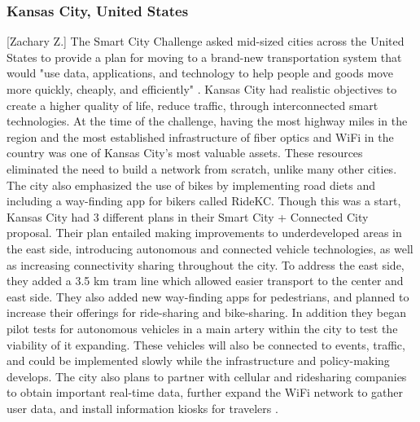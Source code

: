 \documentclass[12pt]{article}                       %
\begin{document}
\subsubsection{Kansas City, United States}[Zachary Z.]
The Smart City Challenge asked mid-sized cities across the United States to provide a plan for moving to a brand-new transportation system that would "use data, applications, and technology to help people and goods move more quickly, cheaply, and efficiently" \cite{2016BeyondChallengeb}. Kansas City had realistic objectives to create a higher quality of life, reduce traffic, through interconnected smart technologies. At the time of the challenge, having the most highway miles in the region and the most established infrastructure of fiber optics and WiFi in the country was one of Kansas City's most valuable assets. These resources eliminated the need to build a network from scratch, unlike many other cities. The city also emphasized the use of bikes by implementing road diets and including a way-finding app for bikers called RideKC. Though this was a start, Kansas City had 3 different plans in their Smart City + Connected City proposal. Their plan entailed making improvements to underdeveloped areas in the east side, introducing autonomous and connected vehicle technologies, as well as increasing connectivity sharing throughout the city. To address the east side, they added a 3.5 km tram line which allowed easier transport to the center and east side. They also added new way-finding apps for pedestrians, and planned to increase their offerings for ride-sharing and bike-sharing. In addition they began pilot tests for autonomous vehicles in a main artery within the city to test the viability of it expanding. These vehicles will also be connected to events, traffic, and could be implemented slowly while the infrastructure and policy-making develops. The city also plans to partner with cellular and ridesharing companies to obtain important real-time data, further expand the WiFi network to gather user data, and install information kiosks for travelers \cite{2016BeyondChallengeb}.
\end{document}
